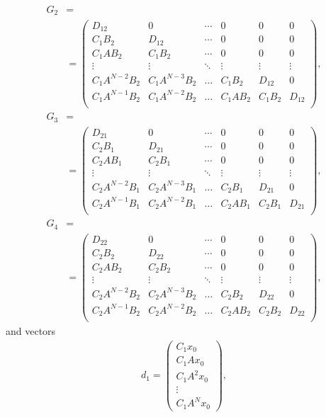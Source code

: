 \begin{align}G_2 & = \nonumber\\
&= \begin{pmatrix}
D_{12} & 0 & \cdots & 0 & 0 & 0 \\
C_1B_2 & D_{12} & \cdots & 0 & 0 & 0\\
C_1AB_2 & C_1B_2 & \cdots & 0 & 0 & 0\\
\vdots & \vdots & \ddots & \vdots  & \vdots & \vdots \\
C_1A^{N-2} B_2 & C_1A^{N-3} B_2 &\dots &C_1B_2 & D_{12}& 0\\
C_1A^{N-1} B_2 & C_1A^{N-2} B_2 &\dots &C_1AB_2 & C_1B_2& D_{12}\\
\end{pmatrix},
\end{align}
\begin{align}
G_3 & = \nonumber\\
&= \begin{pmatrix}
D_{21} & 0 & \cdots & 0 & 0 & 0 \\
C_2B_1 & D_{21} & \cdots & 0 & 0 & 0\\
C_2AB_1 & C_2B_1 & \cdots & 0 & 0 & 0\\
\vdots & \vdots & \ddots & \vdots  & \vdots & \vdots \\
C_2A^{N-2} B_1 & C_2A^{N-3} B_1 &\dots &C_2B_1 & D_{21}& 0\\
C_2A^{N-1} B_1 & C_2A^{N-2} B_1 &\dots &C_2AB_1 & C_2B_1& D_{21}\\
\end{pmatrix},
\end{align}
\begin{align}
G_4 & = \nonumber\\
&= \begin{pmatrix}
D_{22} & 0 & \cdots & 0 & 0 & 0 \\
C_2B_2 & D_{22} & \cdots & 0 & 0 & 0\\
C_2AB_2 & C_2B_2 & \cdots & 0 & 0 & 0\\
\vdots & \vdots & \ddots & \vdots  & \vdots & \vdots \\
C_2A^{N-2} B_2 & C_2A^{N-3} B_2 &\dots &C_2B_2 & D_{22}& 0\\
C_2A^{N-1} B_2 & C_2A^{N-2} B_2 &\dots &C_2AB_2 & C_2B_2& D_{22}\\
\end{pmatrix},
\end{align}
and vectors 
\begin{align}
d_1 = \begin{pmatrix}
C_1 x_0 \\ C_1A x_0 \\ C_1A^2 x_0 \\ \vdots \\ C_1A^Nx_0
\end{pmatrix},
\end{align}
